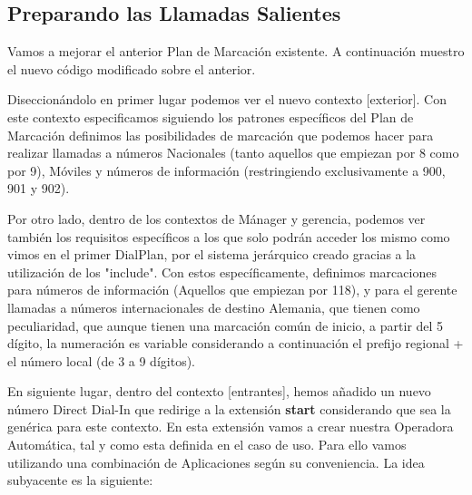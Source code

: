 \newpage

\color[rgb]{0,0,0}

\subsection{Preparando las Llamadas Salientes}

Vamos a mejorar el anterior Plan de Marcación existente. A continuación muestro el nuevo código modificado sobre el anterior.



Diseccionándolo en primer lugar podemos ver el nuevo contexto [exterior]. Con este contexto especificamos siguiendo los patrones específicos del Plan de Marcación definimos las posibilidades de marcación que podemos hacer para realizar llamadas a números Nacionales (tanto aquellos que empiezan por 8 como por 9), Móviles y números de información (restringiendo exclusivamente a 900, 901 y 902). 

Por otro lado, dentro de los contextos de Mánager y gerencia, podemos ver también los requisitos específicos a los que solo podrán acceder los mismo como vimos en el primer DialPlan, por el sistema jerárquico creado gracias a la utilización de los "include". Con estos específicamente, definimos marcaciones para números de información (Aquellos que empiezan por 118), y para el gerente llamadas a números internacionales de destino Alemania, que tienen como peculiaridad, que aunque tienen una marcación común de inicio, a partir del 5 dígito, la numeración es variable considerando a continuación el prefijo regional + el número local (de 3 a 9 dígitos).

En siguiente lugar, dentro del contexto [entrantes], hemos añadido un nuevo número Direct Dial-In que redirige a la extensión \textbf{start} considerando que sea la genérica para este contexto. En esta extensión vamos a crear nuestra Operadora Automática, tal y como esta definida en el caso de uso. Para ello vamos utilizando una combinación de Aplicaciones según su conveniencia. La idea subyacente es la siguiente:


